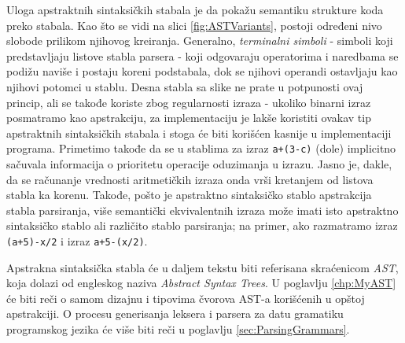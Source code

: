 Uloga apstraktnih sintaksičkih stabala \cite{FormalSyntaxAndSemantics} je da pokažu semantiku strukture koda preko stabala. Kao što se vidi na slici \ref{fig:ASTVariants}, postoji određeni nivo slobode prilikom njihovog kreiranja. Generalno, \emph{terminalni simboli} - simboli koji predstavljaju listove stabla parsera - koji odgovaraju operatorima i naredbama se podižu naviše i postaju koreni podstabala, dok se njihovi operandi ostavljaju kao njihovi potomci u stablu. Desna stabla sa slike ne prate u potpunosti ovaj princip, ali se takođe koriste zbog regularnosti izraza - ukoliko binarni izraz posmatramo kao apstrakciju, za implementaciju je lakše koristiti ovakav tip apstraktnih sintaksičkih stabala i stoga će biti korišćen kasnije u implementaciji programa. Primetimo takođe da se u stablima za izraz \texttt{a+(3-c)} (dole) implicitno sačuvala informacija o prioritetu operacije oduzimanja u izrazu. Jasno je, dakle, da se računanje vrednosti aritmetičkih izraza onda vrši kretanjem od listova stabla ka korenu. Takođe, pošto je apstraktno sintaksičko stablo apstrakcija stabla parsiranja, više semantički ekvivalentnih izraza može imati isto apstraktno sintaksičko stablo ali različito stablo parsiranja; na primer, ako razmatramo izraz \texttt{(a+5)-x/2} i izraz \texttt{a+5-(x/2)}.

Apstrakna sintaksička stabla će u daljem tekstu biti referisana skraćenicom \emph{AST}, koja dolazi od engleskog naziva \emph{Abstract Syntax Trees}. U poglavlju \ref{chp:MyAST} će biti reči o samom dizajnu i tipovima čvorova AST-a korišćenih u opštoj apstrakciji. O procesu generisanja leksera i parsera za datu gramatiku programskog jezika će više biti reči u poglavlju \ref{sec:ParsingGrammars}.
